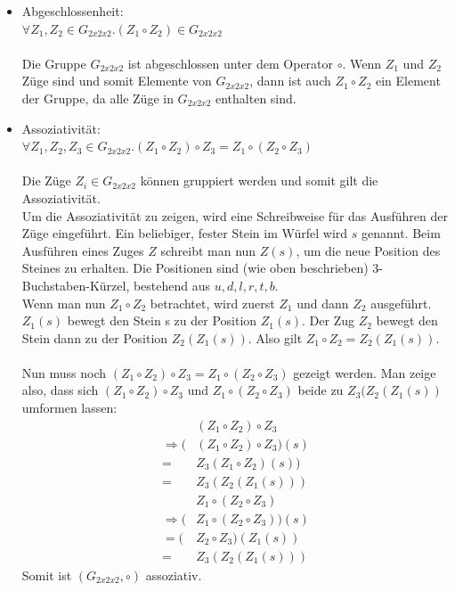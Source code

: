 \documentclass[12pt,a4paper, usenames, dvipsnames]{article}
\begin{document}
\begin{itemize}
\item Abgeschlossenheit: \\ 
$\forall Z_1,Z_2 \in G_{2x2x2} .  (Z_1 \circ Z_2) \in G_{2x2x2} $ \\
\\
Die Gruppe $G_{2x2x2}$ ist abgeschlossen unter dem Operator $\circ$. Wenn $Z_1 $ und $Z_2$ Züge sind und somit Elemente von $G_{2x2x2}$, dann ist auch $Z_1 \circ Z_2$ ein Element der Gruppe, da alle Züge in $G_{2x2x2}$ enthalten sind. 

\item Assoziativität:\\ 
$\forall Z_1,Z_2,Z_3 \in G_{2x2x2}.(Z_1 \circ Z_2) \circ Z_3 = Z_1 \circ (Z_2 \circ Z_3)$ \\
\\
Die Züge $Z_i \in G_{2x2x2}$ können gruppiert werden und somit gilt die Assoziativität. \\
Um die Assoziativität zu zeigen, wird eine Schreibweise für das Ausführen der Züge eingeführt. Ein beliebiger, fester Stein im Würfel wird $s$ genannt. Beim Ausführen eines Zuges $Z$ schreibt man nun $Z(s)$, um die neue Position des Steines zu erhalten. Die Positionen sind (wie oben beschrieben) 3-Buchstaben-Kürzel, bestehend aus $u, d, l, r, t, b$. \\
Wenn man nun $Z_1 \circ Z_2 $ betrachtet, wird zuerst $Z_1$ und dann $Z_2$ ausgeführt. $Z_1(s)$ bewegt den Stein s zu der Position $Z_1(s)$. Der Zug $Z_2$ bewegt den Stein dann zu der Position $Z_2(Z_1(s))$. Also gilt $Z_1 \circ Z_2 = Z_2(Z_1(s))$. \\
\\
Nun muss noch $(Z_1 \circ Z_2) \circ Z_3 = Z_1 \circ (Z_2 \circ Z_3)$ gezeigt werden. Man zeige also, dass sich $(Z_1 \circ Z_2) \circ Z_3$ und $Z_1 \circ (Z_2 \circ Z_3)$ beide zu $Z_3(Z_2(Z_1(s))$ umformen lassen: \\
\begin{align*}
& (Z_1 \circ Z_2) \circ Z_3  \\
\Rightarrow (&(Z_1 \circ Z_2) \circ Z_3)(s) \\
= & Z_3(Z_1 \circ Z_2)(s)) \\
= & Z_3(Z_2(Z_1(s)))  
\end{align*}
\begin{align*}
&Z_1 \circ (Z_2 \circ Z_3) \\
\Rightarrow (&Z_1 \circ (Z_2 \circ Z_3))(s) \\
= (&Z_2 \circ Z_3)(Z_1(s)) \\
= \ \ & Z_3(Z_2(Z_1(s)))  
\end{align*}
Somit ist $(G_{2x2x2}, \circ)$ assoziativ.


\end{itemize}
\end{document}
